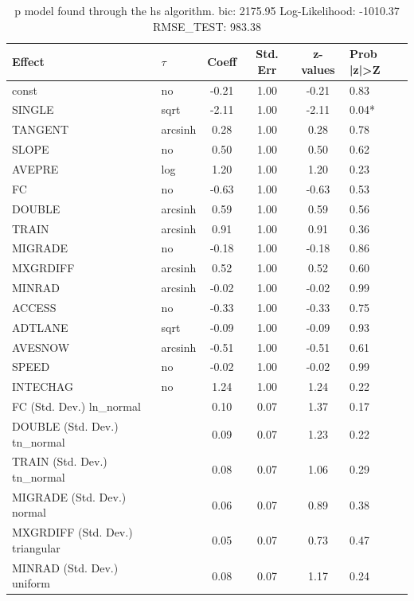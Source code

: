 \begin{table}
	\caption{p model found through the hs algorithm. bic: 2175.95 Log-Likelihood: -1010.37 RMSE_TEST: 983.38}
	\begin{center}
		\begin{tabular}{|l|l|c|c|c|l|}
			\hline
			Effect & $\tau$ & Coeff & Std. Err & z-values & Prob |z|>Z \\
			\hline
			const & no & -0.21 & 1.00 & -0.21 & 0.83 \\
			\hline
			SINGLE & sqrt & -2.11 & 1.00 & -2.11 & 0.04* \\
			\hline
			TANGENT & arcsinh & 0.28 & 1.00 & 0.28 & 0.78 \\
			\hline
			SLOPE & no & 0.50 & 1.00 & 0.50 & 0.62 \\
			\hline
			AVEPRE & log & 1.20 & 1.00 & 1.20 & 0.23 \\
			\hline
			FC & no & -0.63 & 1.00 & -0.63 & 0.53 \\
			\hline
			DOUBLE & arcsinh & 0.59 & 1.00 & 0.59 & 0.56 \\
			\hline
			TRAIN & arcsinh & 0.91 & 1.00 & 0.91 & 0.36 \\
			\hline
			MIGRADE & no & -0.18 & 1.00 & -0.18 & 0.86 \\
			\hline
			MXGRDIFF & arcsinh & 0.52 & 1.00 & 0.52 & 0.60 \\
			\hline
			MINRAD & arcsinh & -0.02 & 1.00 & -0.02 & 0.99 \\
			\hline
			ACCESS & no & -0.33 & 1.00 & -0.33 & 0.75 \\
			\hline
			ADTLANE & sqrt & -0.09 & 1.00 & -0.09 & 0.93 \\
			\hline
			AVESNOW & arcsinh & -0.51 & 1.00 & -0.51 & 0.61 \\
			\hline
			SPEED & no & -0.02 & 1.00 & -0.02 & 0.99 \\
			\hline
			INTECHAG & no & 1.24 & 1.00 & 1.24 & 0.22 \\
			\hline
			FC (Std. Dev.) ln_normal &  & 0.10 & 0.07 & 1.37 & 0.17 \\
			\hline
			DOUBLE (Std. Dev.) tn_normal &  & 0.09 & 0.07 & 1.23 & 0.22 \\
			\hline
			TRAIN (Std. Dev.) tn_normal &  & 0.08 & 0.07 & 1.06 & 0.29 \\
			\hline
			MIGRADE (Std. Dev.) normal &  & 0.06 & 0.07 & 0.89 & 0.38 \\
			\hline
			MXGRDIFF (Std. Dev.) triangular &  & 0.05 & 0.07 & 0.73 & 0.47 \\
			\hline
			MINRAD (Std. Dev.) uniform &  & 0.08 & 0.07 & 1.17 & 0.24 \\

\end{tabular}
\end{center}
\end{table}
